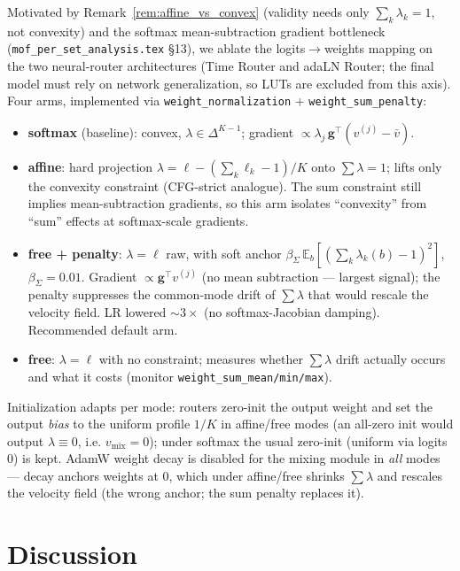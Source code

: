 \documentclass[11pt,a4paper]{article}
\newcommand{\E}{\mathbb{E}}
\theoremstyle{definition}
\begin{document}
Motivated by Remark~\ref{rem:affine_vs_convex} (validity needs only
$\sum_k\lambda_k=1$, not convexity) and the softmax mean-subtraction
gradient bottleneck (\texttt{mof\_per\_set\_analysis.tex} \S13), we ablate
the logits$\to$weights mapping on the two neural-router architectures
(Time Router and adaLN Router; the final model must rely on network
generalization, so LUTs are excluded from this axis). Four arms,
implemented via \texttt{weight\_normalization} +
\texttt{weight\_sum\_penalty}:
\begin{itemize}[leftmargin=1.5em]
\item \textbf{softmax} (baseline): convex, $\lambda\in\Delta^{K-1}$;
gradient $\propto \lambda_j\,\mathbf{g}^\top(v^{(j)}-\bar v)$.
\item \textbf{affine}: hard projection
$\lambda = \ell - (\sum_k\ell_k - 1)/K$ onto $\sum\lambda=1$; lifts only
the convexity constraint (CFG-strict analogue). The sum constraint still
implies mean-subtraction gradients, so this arm isolates
``convexity'' from ``sum'' effects at softmax-scale gradients.
\item \textbf{free + penalty}: $\lambda=\ell$ raw, with soft anchor
$\beta_\Sigma\,\E_b[(\sum_k\lambda_k(b)-1)^2]$, $\beta_\Sigma=0.01$.
Gradient $\propto \mathbf{g}^\top v^{(j)}$ (no mean subtraction —
largest signal); the penalty suppresses the common-mode drift of
$\sum\lambda$ that would rescale the velocity field. LR lowered
$\sim 3\times$ (no softmax-Jacobian damping). Recommended default arm.
\item \textbf{free}: $\lambda=\ell$ with no constraint; measures whether
$\sum\lambda$ drift actually occurs and what it costs
(monitor \texttt{weight\_sum\_mean/min/max}).
\end{itemize}
Initialization adapts per mode: routers zero-init the output weight and
set the output \emph{bias} to the uniform profile $1/K$ in affine/free
modes (an all-zero init would output $\lambda\equiv 0$, i.e.\@
$v_{\mathrm{mix}}=0$); under softmax the usual zero-init (uniform via
logits $0$) is kept. AdamW weight decay is disabled for the mixing
module in \emph{all} modes — decay anchors weights at $0$, which under
affine/free shrinks $\sum\lambda$ and rescales the velocity field (the
wrong anchor; the sum penalty replaces it).

\section{Discussion}
\label{sec:discussion}
\end{document}
